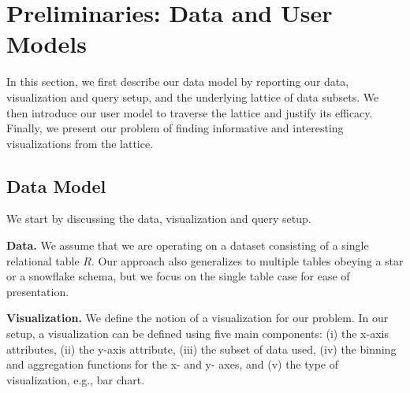 \section{Preliminaries: Data and User Models} 

In this section, we first describe our data model by reporting our data, visualization and query setup, and the underlying lattice of data subsets. We then introduce our user model to traverse the lattice and justify its efficacy. Finally, we present our problem of finding informative and interesting visualizations from the lattice.


\subsection{Data Model}
We start by discussing the data, visualization and query setup.

\textbf{Data.} We assume that we are operating on a dataset consisting of a single relational table $R$. Our approach also generalizes to multiple tables obeying a star or a snowflake schema, but we focus on the single table case for ease of presentation.



\textbf{Visualization.} We define the notion of a visualization for our problem. In our setup, a visualization can be defined using five main components: (i) the x-axis attributes, (ii) the y-axis attribute, (iii) the subset of data used, (iv) the binning and aggregation functions for the x- and y- axes, and (v) the type of visualization, e.g., bar chart.


